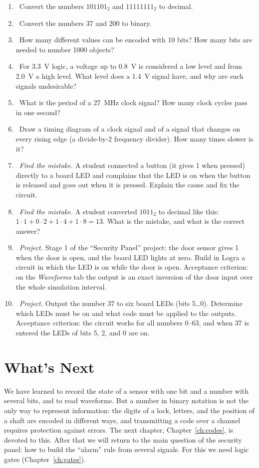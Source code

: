 \begin{taskbox}
\begin{enumerate}
  \item {}~Convert the numbers $101101_2$ and $11111111_2$ to decimal.
  \item {}~Convert the numbers 37 and 200 to binary.
  \item {}~How many different values can be encoded with 10 bits? How many bits are needed to number 1000 objects?
  \item {}~For 3.3~V logic, a voltage up to 0.8~V is considered a low level and from 2.0~V a high level. What level does a 1.4~V signal have, and why are such signals undesirable?
  \item {}~What is the period of a 27~MHz clock signal? How many clock cycles pass in one second?
  \item {}~Draw a timing diagram of a clock signal and of a signal that changes on every rising edge (a divide-by-2 frequency divider). How many times slower is it?
  \item {}~\emph{Find the mistake.} A student connected a button (it gives 1 when pressed) directly to a board LED and complains that the LED is on when the button is released and goes out when it is pressed. Explain the cause and fix the circuit.
  \item {}~\emph{Find the mistake.} A student converted $1011_2$ to decimal like this: $1\cdot1+0\cdot2+1\cdot4+1\cdot8=13$. What is the mistake, and what is the correct answer?
  \item {}~\emph{Project.} Stage 1 of the ``Security Panel'' project: the door sensor gives 1 when the door is open, and the board LED lights at zero. Build in Logra a circuit in which the LED is on while the door is open. Acceptance criterion: on the \emph{Waveforms} tab the output  is an exact inversion of the door input over the whole simulation interval.
  \item {}~\emph{Project.} Output the number 37 to six board LEDs (bits 5\ldots 0). Determine which LEDs must be on and what code must be applied to the  outputs. Acceptance criterion: the circuit works for all numbers 0--63, and when 37 is entered the LEDs of bits 5, 2, and 0 are on.
\end{enumerate}
\end{taskbox}

\section{What's Next}

We have learned to record the state of a sensor with one bit and a number with
several bits, and to read waveforms. But a number in binary notation is not
the only way to represent information: the digits of a lock, letters, and the
position of a shaft are encoded in different ways, and transmitting a code
over a channel requires protection against errors. The next chapter,
Chapter~\ref{ch:codes}, is devoted to this. After that we will return to the
main question of the security panel: how to build the ``alarm'' rule from
several signals. For this we need logic gates (Chapter~\ref{ch:gates}).
